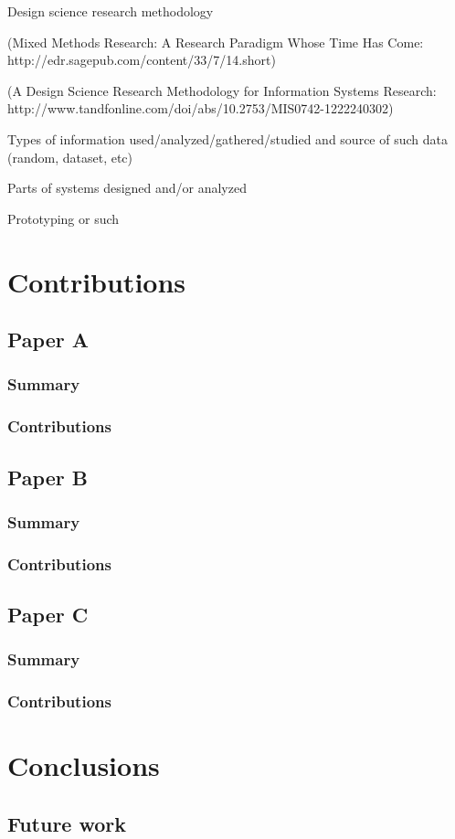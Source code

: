 \documentclass[showtrims]{kthesis}
\begin{document}
Design science research methodology

(Mixed Methods Research: A Research Paradigm Whose Time Has Come: http://edr.sagepub.com/content/33/7/14.short)

(A Design Science Research Methodology for Information Systems Research: http://www.tandfonline.com/doi/abs/10.2753/MIS0742-1222240302)

Types of information used/analyzed/gathered/studied and source of such data (random, dataset, etc)

Parts of systems designed and/or analyzed

Prototyping or such



\chapter{Contributions}
\section{Paper A}
\subsection{Summary}
\subsection{Contributions}
\section{Paper B}
\subsection{Summary}
\subsection{Contributions}
\section{Paper C}
\subsection{Summary}
\subsection{Contributions}


\chapter{Conclusions}

\section{Future work}
\end{document}

